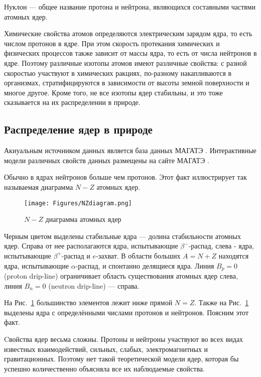 \documentclass[a5paper,openany]{book}
\begin{document}
Нуклон --- общее название протона и нейтрона, являющихся составными частями атомных ядер. 


Химические свойства атомов определяются электрическим зарядом ядра, то есть числом протонов в ядре. При этом скорость протекания химических и физических процессов также зависит от массы ядра, то есть от числа нейтронов в ядре. Поэтому  различные изотопы атомов имеют различные свойства: с разной скоростью участвуют в химических ракциях, по-разному накапливаются в организмах, стратифицируются в зависимости от высоты земной поверхности и многое другое. Кроме того, не все изотопы ядер стабильны, и это тоже сказывается на их распределении в природе.

\subsection{Распределение ядер в природе}\label{s:NZ}

Акиуальным источником данных является база данных МАГАТЭ \cite{NUBASE2020}.
Интерактивные модели различных свойств данных размещены на сайте МАГАТЭ  \cite{IAEA}.

Обычно в ядрах нейтронов больше чем протонов. Этот факт иллюстрирует так называемая диаграмма $N-Z$ атомных ядер. 

\begin{figure}[ht] 
	\centering\small
	\unitlength=1mm
	\texttt{[image: Figures/NZdiagram.png]} 
	\caption{$N-Z$ диаграмма  атомных ядер \cite{NuclPhys}} 
	\label{f:NZdiagram}
\end{figure}
Черным цветом выделены стабильные ядра --- долина стабильности атомных ядер.  
Справа от нее располагаются ядра, испытывающие $\beta^{-}$-распад, слева - ядра, испытывающие $\beta^{+}$-распад и $e$-захват. В области больших $A = N+Z$ находятся ядра, испытывающие $\alpha$-распад, и спонтанно делящиеся ядра. 
Линия $B_p = 0$ (proton drip-line) ограничивает
область существования атомных ядер слева, линия $B_n = 0$ (neutron drip-line) --- справа.

На Рис.~\ref{f:NZdiagram} большинство элементов лежит ниже прямой $N=Z$.
Также на Рис.~\ref{f:NZdiagram} выделены ядра с определёнными числами протонов и нейтронов. Поясним этот факт.

Cвойства ядер весьма сложны. Протоны и нейтроны участвуют во всех видах известных взаимодействий, сильных, слабых, электромагнитных и гравитационных. Поэтому нет такой теоретической модели ядер, которая бы успешно количественно объясняла все их наблюдаемые свойства.
\end{document}
